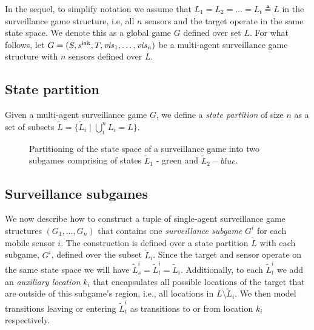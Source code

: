 In the sequel, to simplify notation we assume that $L_1 = L_2 = \dots = L_t \triangleq L$  in the surveillance game structure, i.e, all $n$ sensors and the target operate in the same state space. We denote this as a global game $G$ defined over set $L$. For what follows, let $G=(S,s^{\mathsf{init}},T,\mathit{vis}_1,\ldots,\mathit{vis}_n)$ be a multi-agent surveillance game structure with $n$ sensors defined over $L$.

\subsection{State partition}
Given a multi-agent surveillance game $G$, we define a \emph{state partition} of size $n$ as a set of subsets $\widetilde{L} = \{\widetilde{L}_i \mid \bigcup_i^n L_i = L \}$. 

\begin{figure}
{}


\caption{Partitioning of the state space of a surveillance game into two subgames comprising of states $\widetilde{L}_1$ - green and $\widetilde{L}_2 - blue$. }
\label{fig:simple-dist-game}
\vspace{-.5cm}
\end{figure}

\subsection{Surveillance subgames}
We now describe how to construct a tuple of single-agent surveillance game structures $(G_1,\ldots,G_n)$ that contains one  \emph{surveillance subgame} $G^i$ for each mobile sensor  $i$. The construction is defined over a state partition $\widetilde{L}$ with each subgame, $G^i$, defined over the subset $\widetilde{L}_i$. Since the target and sensor operate on the same state space we will have $\widetilde{L}^i_s = \widetilde{L}^i_t = \widetilde{L}_i$. Additionally, to each $\widetilde{L}^i_t$ we add an \emph{auxiliary location} $k_i$ that encapsulates all possible locations of the target that are outside of this subgame's region, i.e., all locations in $L \setminus \widetilde{L}_i$.  We then model transitions leaving or entering $\widetilde{L}^i_t$ as transitions to or from location $k_i$ respectively.


